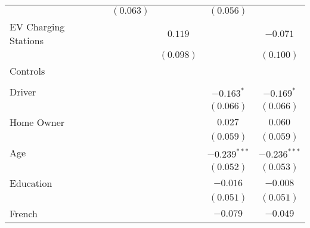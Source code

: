 \begin{center}
\begin{tiny}
\begin{longtable}{l@{} c@{} c@{} c@{} c@{} c@{}}
                                                      &                 & $(0.063)$        &                 & $(0.056)$        &                  \\
\quad EV Charging Stations                            &                 &                  & $0.119$         &                  & $-0.071$         \\
                                                      &                 &                  & $(0.098)$       &                  & $(0.100)$        \\
Controls                                              &                 &                  &                 &                  &                  \\
                                                      &                 &                  &                 &                  &                  \\
\quad Driver                                          &                 &                  &                 & $-0.163^{*}$     & $-0.169^{*}$     \\
                                                      &                 &                  &                 & $(0.066)$        & $(0.066)$        \\
\quad Home Owner                                      &                 &                  &                 & $0.027$          & $0.060$          \\
                                                      &                 &                  &                 & $(0.059)$        & $(0.059)$        \\
\quad Age                                             &                 &                  &                 & $-0.239^{***}$   & $-0.236^{***}$   \\
                                                      &                 &                  &                 & $(0.052)$        & $(0.053)$        \\
\quad Education                                       &                 &                  &                 & $-0.016$         & $-0.008$         \\
                                                      &                 &                  &                 & $(0.051)$        & $(0.051)$        \\
\quad French                                          &                 &                  &                 & $-0.079$         & $-0.049$         \\

\end{longtable}
\end{tiny}
\end{center}

